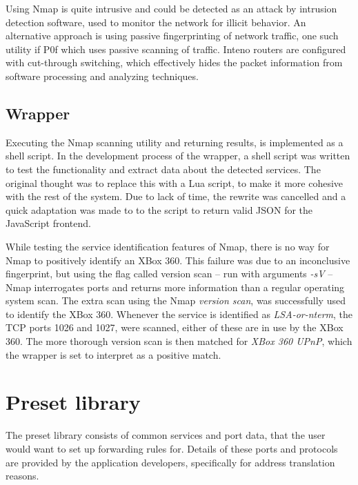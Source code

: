 \documentclass[g5paper,11pt]{kth-bcs}
\begin{document}
Using Nmap is quite intrusive and could be detected as an attack by intrusion detection software, used to monitor the network for illicit behavior.
An alternative approach is using passive fingerprinting of network traffic, one such utility if P0f which uses passive scanning of traffic.\cite{p0f}
Inteno routers are configured with cut-through switching, which effectively hides the packet information from software processing and analyzing techniques.

\subsection{Wrapper}
Executing the Nmap scanning utility and returning results, is implemented as a shell script.
In the development process of the wrapper, a shell script was written to test the functionality and extract data about the detected services.
The original thought was to replace this with a Lua script, to make it more cohesive with the rest of the system.
Due to lack of time, the rewrite was cancelled and a quick adaptation was made to to the script to return valid JSON for the JavaScript frontend.

While testing the service identification features of Nmap, there is no way for Nmap to positively identify an XBox 360.
This failure was due to an inconclusive fingerprint, but using the flag called version scan -- run with arguments \emph{-sV} -- Nmap interrogates ports and returns more information than a regular operating system scan.
The extra scan using the Nmap \emph{version scan}, was successfully used to identify the XBox 360.
Whenever the service is identified as \emph{LSA-or-nterm}, the TCP ports 1026 and 1027, were scanned, either of these are in use by the XBox 360.\cite{aretheysecure}
The more thorough version scan is then matched for \emph{XBox 360 UPnP}, which the wrapper is set to interpret as a positive match.

\section{Preset library}
The preset library consists of common services and port data, that the user would want to set up forwarding rules for.
Details of these ports and protocols are provided by the application developers, specifically for address translation reasons.
\end{document}
